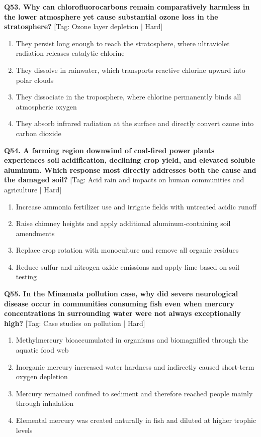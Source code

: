 \noindent\textbf{Q53. Why can chlorofluorocarbons remain comparatively harmless in the lower atmosphere yet cause substantial ozone loss in the stratosphere?} \hfill [Tag: Ozone layer depletion | Hard]
\begin{enumerate}[label=(\alph*),topsep=2pt,itemsep=1pt,partopsep=0pt,parsep=0pt]
    \item {They persist long enough to reach the stratosphere, where ultraviolet radiation releases catalytic chlorine}
    \item {They dissolve in rainwater, which transports reactive chlorine upward into polar clouds}
    \item {They dissociate in the troposphere, where chlorine permanently binds all atmospheric oxygen}
    \item {They absorb infrared radiation at the surface and directly convert ozone into carbon dioxide}
\end{enumerate}
\vspace{2mm}

\noindent\textbf{Q54. A farming region downwind of coal-fired power plants experiences soil acidification, declining crop yield, and elevated soluble aluminum. Which response most directly addresses both the cause and the damaged soil?} \hfill [Tag: Acid rain and impacts on human communities and agriculture | Hard]
\begin{enumerate}[label=(\alph*),topsep=2pt,itemsep=1pt,partopsep=0pt,parsep=0pt]
    \item {Increase ammonia fertilizer use and irrigate fields with untreated acidic runoff}
    \item {Raise chimney heights and apply additional aluminum-containing soil amendments}
    \item {Replace crop rotation with monoculture and remove all organic residues}
    \item {Reduce sulfur and nitrogen oxide emissions and apply lime based on soil testing}
\end{enumerate}
\vspace{2mm}

\noindent\textbf{Q55. In the Minamata pollution case, why did severe neurological disease occur in communities consuming fish even when mercury concentrations in surrounding water were not always exceptionally high?} \hfill [Tag: Case studies on pollution | Hard]
\begin{enumerate}[label=(\alph*),topsep=2pt,itemsep=1pt,partopsep=0pt,parsep=0pt]
    \item {Methylmercury bioaccumulated in organisms and biomagnified through the aquatic food web}
    \item {Inorganic mercury increased water hardness and indirectly caused short-term oxygen depletion}
    \item {Mercury remained confined to sediment and therefore reached people mainly through inhalation}
    \item {Elemental mercury was created naturally in fish and diluted at higher trophic levels}
\end{enumerate}
\vspace{2mm}

